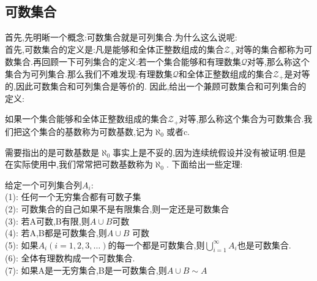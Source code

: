 \subsection{可数集合}
首先,先明晰一个概念:可数集合就是可列集合.为什么这么说呢:
\\ 
首先,可数集合的定义是:凡是能够和全体正整数组成的集合\(\mathcal{Z}_{+}\)对等的集合都称为可数集合.再回顾一下可列集合的定义:若一个集合能够和有理数集\(\mathcal{Q}\)对等,那么称这个集合为可列集合.那么我们不难发现:有理数集\(\mathcal{Q}\)和全体正整数组成的集合\(\mathcal{Z}_{+}\)是对等的,因此可数集合和可列集合是等价的.
因此,给出一个兼顾可数集合和可列集合的定义:
\begin{Definition}
    如果一个集合能够和全体正整数组成的集合\(\mathcal{Z}_{+}\)对等,那么称这个集合为可数集合.我们把这个集合的基数称为可数基数,记为\(\aleph_0\)或者c.
\end{Definition}
需要指出的是可数基数是\(\aleph_0\)事实上是不妥的,因为连续统假设并没有被证明.但是在实际使用中,我们常常把可数基数称为\(\aleph_0\).
下面给出一些定理:
\begin{Theorem}给定一个可列集合列\(A_i\): \\ 
    (1): 任何一个无穷集合都有可数子集 \\ 
    (2): 可数集合的自己如果不是有限集合,则一定还是可数集合 \\ 
    (3): 若A可数,B有限,则\(A \cup B\)可数 \\ 
    (4): 若A,B都是可数集合,则\(A \cup B\) 可数 \\ 
    (5): 如果\(A_i (i=1,2,3,\dots )\)的每一个都是可数集合,则\(\bigcup\limits_{i=1}^{\infty} A_i\)也是可数集合. \\ 
    (6): 全体有理数构成一个可数集合.  \\ 
    (7): 如果A是一无穷集合,B是一可数集合,则\(A\cup B \sim A\)
\end{Theorem}
